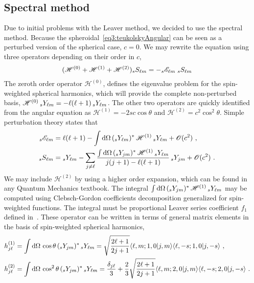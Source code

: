 \subsection{Spectral method}

Due to initial problems with the Leaver method, we decided to use the spectral method.
Because the spheroidal~\eqref{eq3:teukolskyAngular} can be seen as a perturbed version of the spherical case, $c=0$.
We may rewrite the equation using three operators depending on their order in $c$, 
\begin{align}
	\label{eq4:angularEqH012}
	( \mathscr{H}^{(0)} +  \mathscr{H}^{(1)} + \mathscr{H}^{(2)} ) \uu[s]{S}{\ell m} = - \uu[s]{\mathscr{E}}{\ell m}  \;\uu[s]{S}{\ell m} 
\end{align}
The zeroth order operator $\mathscr{H}^{(0)}$, defines the eigenvalue problem for the spin-weighted spherical harmonics, which will provide the complete non-perturbed basis, $\mathscr{H}^{(0)} \,\uu[s]{Y}{\ell m} = -\ell(\ell+1) \,\uu[s]{Y}{\ell m}$.
The other two operators are quickly identified from the angular equation as $\mathscr{H}^{(1)} = - 2 s c \cos\theta$ and $\mathscr{H}^{(2)} = c^2 \cos^2\theta$.
Simple perturbation theory states that
\begin{align}
	\uu[s]{\mathscr{E}}{\ell m} &= \ell(\ell+1) - \int \dd\Omega \,(\uu[s]{Y}{\ell m})^* \,\mathscr{H}^{(1)} \,\uu[s]{Y}{\ell m} + \mathscr{O}(c^2) ~, \\
	\uu[s]{S}{\ell m} &= \uu[s]{Y}{\ell m} - \sum_{j\ne\ell} \frac{\int \dd\Omega \,(\uu[s]{Y}{j m})^* \,\mathscr{H}^{(1)} \,\uu[s]{Y}{\ell m}}{j(j+1)-\ell(\ell+1)} \, \uu[s]{Y}{j m} +\mathscr{O}(c^2) ~.
\end{align}
We may include $\mathscr{H}^{(2)}$ by using a higher order expansion, which can be found in any Quantum Mechanics textbook.
The integral $\int \dd\Omega \,(\uu[s]{Y}{j m})^* \,\mathscr{H}^{(1)} \,\uu[s]{Y}{\ell m}$ may be computed using Clebsch-Gordon coefficients decomposition generalized for spin-weighted functions. The integral must be proportional Leaver series coefficient $f_1$ defined in~.
These operator can be written in terms of general matrix elements in the basis of spin-weighted spherical harmonics,
\begin{align}
	\begin{split}
	h^{(1)}_{j\ell} &= \int \dd\Omega \,\cos\theta \,(\uu[s]{Y}{j m})^* \,\uu[s]{Y}{\ell m} = \sqrt{\frac{2 \ell+1}{2 j+1}} \langle \ell,m; 1,0 | j,m \rangle \langle \ell, -s; 1,0 | j, -s \rangle ~, \\
	h^{(2)}_{j\ell} &= \int \dd\Omega \,\cos^2\theta \,(\uu[s]{Y}{j m})^* \,\uu[s]{Y}{\ell m} = \frac{\delta_{j\ell}}{3} + \frac{2}{3}\sqrt{\frac{2 \ell+1}{2 j+1}} \langle \ell,m; 2,0 | j,m \rangle \langle \ell, -s; 2,0 | j, -s \rangle ~.
	\end{split}
\end{align}

